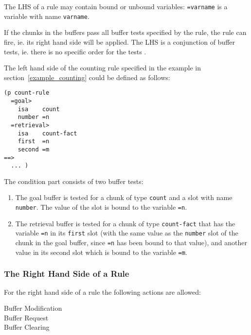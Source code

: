 The LHS of a rule may contain bound or unbound variables: \verb|=varname| is a variable with name \verb|varname|.

If the chunks in the buffers pass all buffer tests specified by the rule, the rule can fire, ie. its right hand side will be applied. The LHS is a conjunction of buffer tests, ie. there is no specific order for the tests \cite[p. 165]{actr_reference}.

\begin{example}
The left hand side of the counting rule specified in the example in section~\ref{example_counting} could be defined as follows:

\begin{lstlisting}
(p count-rule
  =goal> 
    isa    count
    number =n
  =retrieval>
    isa    count-fact
    first  =n
    second =m
==>
  ... )
\end{lstlisting}

The condition part consists of two buffer tests:

\begin{enumerate}
 \item The goal buffer is tested for a chunk of type \verb|count| and a slot with name \verb|number|. The value of the slot is bound to the variable \verb|=n|.
 \item The retrieval buffer is tested for a chunk of type \verb|count-fact| that has the variable \verb|=n| in its \verb|first| slot (with the same value as the \verb|number| slot of the chunk in the goal buffer, since \verb|=n| has been bound to that value), and another value in its second slot which is bound to the variable \verb|=m|.
\end{enumerate}

\end{example}

\subsubsection{The Right Hand Side of a Rule}

For the right hand side of a rule the following actions are allowed:

\begin{description}
 \item[Buffer Modification] 
 \item[Buffer Request]
 \item[Buffer Clearing]
\end{description}


